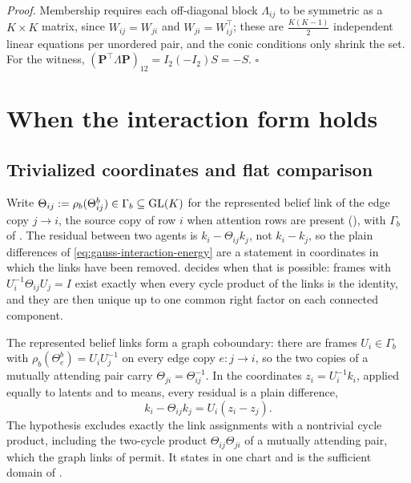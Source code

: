 \noindent\emph{Proof.}
Membership requires each off-diagonal block \(\Lambda_{ij}\) to be symmetric as
a \(K\times K\) matrix, since \(W_{ij}=W_{ji}\) and \(W_{ji}=W_{ij}^\top\); these
are \(\tfrac{K(K-1)}2\) independent linear equations per unordered pair, and the
conic conditions only shrink the set. For the witness,
\((\mathbf P^\top\Lambda \mathbf P)_{12}=I_2(-I_2)S=-S\). \(\square\)

\section{When the interaction form holds}
\label{sec:gauss-hypothesis}

\subsection{Trivialized coordinates and flat comparison}

Write \(\Theta_{ij}:=\rho_b(\Theta_{ij}^b)\in\Gamma_b\subseteq\mathrm{GL}(K)\) for
the represented belief link of the edge copy \(j\to i\), the source copy of
row \(i\) when attention rows are present (), with
\(\Gamma_b\) of . The residual between two agents is
\(k_i-\Theta_{ij}k_j\), not \(k_i-k_j\), so the plain differences of
\eqref{eq:gauss-interaction-energy} are a statement in coordinates in which
the links have been removed. 
decides when that is possible: frames with \(U_i^{-1}\Theta_{ij}U_j=I\) exist
exactly when every cycle product of the links is the identity, and they are
then unique up to one common right factor on each connected component.

The represented belief links form a graph coboundary: there are frames
\(U_i\in\Gamma_b\) with \(\rho_b(\Theta^b_e)=U_iU_j^{-1}\) on every edge copy
\(e:j\to i\), so the two copies of a mutually attending pair carry
\(\Theta_{ji}=\Theta_{ij}^{-1}\). In the coordinates \(z_i=U_i^{-1}k_i\), applied equally to latents and to means,
every residual is a plain difference,
\begin{equation}
k_i-\Theta_{ij}k_j=U_i\left(z_i-z_j\right).
\label{eq:gauss-flat-trivialization}
\end{equation}
The hypothesis excludes exactly the link assignments with a nontrivial cycle
product, including the two-cycle product \(\Theta_{ij}\Theta_{ji}\) of a
mutually attending pair, which the graph links of 
permit. It states
 in one chart and is the sufficient domain
of .

